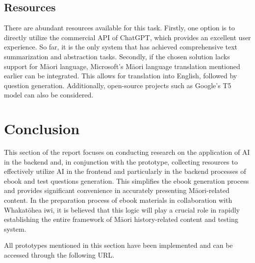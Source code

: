 \subsection{Resources}

There are abundant resources available for this task. 
Firstly, one option is to directly utilize the commercial API of ChatGPT, which provides an excellent user experience. 
So far, it is the only system that has achieved comprehensive text summarization and abstraction tasks. 
Secondly, if the chosen solution lacks support for Māori language, Microsoft's Māori language translation mentioned earlier can be integrated. 
This allows for translation into English, followed by question generation. 
Additionally, open-source projects such as Google's T5 model \autocite{roberts2022t5x} can also be considered.

\section{Conclusion}
This section of the report focuses on conducting research on the application of AI in the backend and, in conjunction with the prototype, collecting resources to effectively utilize AI in the frontend and particularly in the backend processes of ebook and test questions generation. 
This simplifies the ebook generation process and provides significant convenience in accurately presenting Māori-related content. 
In the preparation process of ebook materials in collaboration with Whakatōhea iwi, it is believed that this logic will play a crucial role in rapidly establishing the entire framework of Māori history-related content and testing system.

All prototypes mentioned in this section have been implemented and can be accessed through the following URL\autocite{Page1wh37:online}.